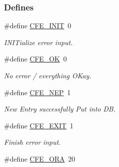 \subsubsection*{Defines}
\begin{CompactItemize}
\item 
\hypertarget{group__errors_gac0ac4dd97f14a0da37622a1497ea004}{
\#define \hyperlink{group__errors_gac0ac4dd97f14a0da37622a1497ea004}{CFE\_\-INIT}~0}
\label{group__errors_gac0ac4dd97f14a0da37622a1497ea004}

\begin{CompactList}\small\item\em INITialize error input. \item\end{CompactList}\item 
\hypertarget{group__errors_gbea2555a62593e79e32879620c4fc8de}{
\#define \hyperlink{group__errors_gbea2555a62593e79e32879620c4fc8de}{CFE\_\-OK}~0}
\label{group__errors_gbea2555a62593e79e32879620c4fc8de}

\begin{CompactList}\small\item\em No error / everything OKay. \item\end{CompactList}\item 
\hypertarget{group__errors_gbb576e88369c2eac1ffd41915292968c}{
\#define \hyperlink{group__errors_gbb576e88369c2eac1ffd41915292968c}{CFE\_\-NEP}~1}
\label{group__errors_gbb576e88369c2eac1ffd41915292968c}

\begin{CompactList}\small\item\em New Entry successfully Put into DB. \item\end{CompactList}\item 
\hypertarget{group__errors_gc799901241871d298d9bd9f79e1ce645}{
\#define \hyperlink{group__errors_gc799901241871d298d9bd9f79e1ce645}{CFE\_\-EXIT}~1}
\label{group__errors_gc799901241871d298d9bd9f79e1ce645}

\begin{CompactList}\small\item\em Finish error input. \item\end{CompactList}\item 
\hypertarget{group__errors_ge5e8ef219f287dc0ff0ca70433f78f0e}{
\#define \hyperlink{group__errors_ge5e8ef219f287dc0ff0ca70433f78f0e}{CFE\_\-ORA}~20}
\label{group__errors_ge5e8ef219f287dc0ff0ca70433f78f0e}


\end{CompactItemize}
